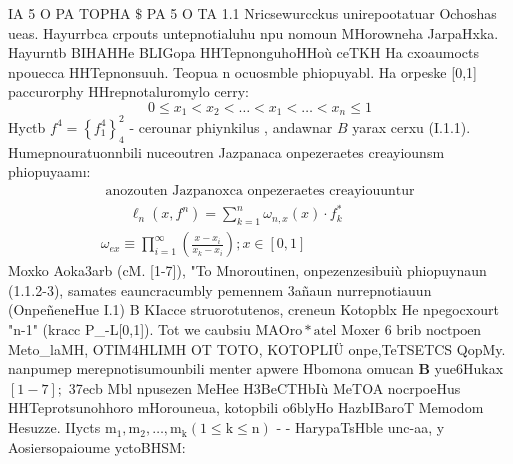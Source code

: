 \documentclass[a4paper,12pt]{amsart}
\begin{document}
IA 5 O PA TOPHA $\$$ PA 5 O TA 1.1
Nricsewurcckus unirepootatuar
Ochoshas ueas. Hayurrbca crpouts untepnotialuhu npu nomoun MHorowneha JarpaHxka. Hayurntb BIHAHHe BLIGopa HHTepnonguhoHHoù ceTKH Ha cxoaumocts npouecca HHTepnonsuuh.
Teopua n ocuosmble phiopuyabl. Ha orpeske [0,1] paccurorphy HHrepnotaluromylo cerry: $$ 0 \leq x_{1}<x_{2}<\ldots<x_{1}<\ldots<x_{n} \leq 1 $$ Hyctb $f^{4}=\left\{f_{1}^{4}\right\}_{4}^{2}$ - cerounar phiynkilus , andawnar $B$ yarax cerxu (I.1.1). Humepnouratuonnbili nuceoutren Jazpanaca onpezeraetes creayiounsm phiopuyaamı:
$$
\begin{array}{l}
\text { anozouten Jazpanoxca onpezeraetes creayiouuntur } \\
\qquad \ell_{n}\left(x, f^{n}\right)=\sum_{k=1}^{n} \omega_{n, x}(x) \cdot f_{k}^{*} \\
\omega_{e x} \equiv \prod_{i=1}^{\infty}\left(\frac{x-x_{i}}{x_{k}-x_{i}}\right) ; x \in[0,1]
\end{array}
$$
Moxko Aoka3arb (cM. [1-7]), "To Mnoroutinen, onpezenzesibuiù phiopuynaun
(1.1.2-3), samates eauncracumbly pemennem 3añaun nurrepnotiauun (OnpeñeneHue
I.1) B KIacce struorotutenos, creneun Kotopblx He npegocxourt "n-1" (kracc
P\_-L[0,1]). Tot we caubsiu $\mathrm{ MAOro*atel } \text { Moxer } 6 \text
{ brib noctpoen }$
Meto\_laMH, OTIM4HLIMH OT TOTO, KOTOPLIÜ onpe,TeTSETCS QopMy. nanpumep merepnotisumounbili menter apwere Hbomona omucan $\mathbf{B}$ yue6Hukax $[1-7] ;$ 37ecb Mbl npusezen MeHee H3BeCTHbIù MeTOA nocrpoeHus
HHTeprotsunohhoro mHorouneua, kotopbili o6blyHo HazbIBaroT Memodom Hesuzze.
IIycts $\mathrm{m}_{1}, \mathrm{m}_{2}, \ldots, \mathrm{m}_{\mathrm{k}}(1 \leq \mathrm{k} \leq \mathrm{n})$ - - HarypaTsHble unc-aa, y Aosiersopaioume
yctoBHSM:


\newpage
\end{document}
